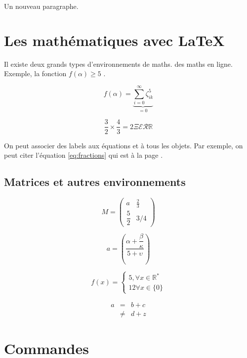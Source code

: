 \documentclass[a4paper, twoside, onecolumn, 10pt]{article}
\begin{document}
Un nouveau paragraphe. 

\section{Les mathématiques avec \LaTeX}

Il existe deux grands types d'environnements de maths. des maths en ligne. Exemple, la fonction $f(\alpha) \geq 5$ . 

$$
f(\alpha) = \underbrace{
			   \sum_{i = 0}^\infty \zeta_{ik}^5
			          }_{=0}		          
$$

\begin{equation}
\frac{3}{2} \times \frac{4}{3} = 2 \Xi \mathcal E \mathcal R \mathbb R
\label{eq:fractions}
\end{equation}

On peut associer des labels aux équations et à tous les objets. Par exemple, on peut citer l'équation \ref{eq:fractions} qui est à la page \pageref{eq:fractions}.

\subsection{Matrices et autres environnements}

\begin{equation}
M = 
\begin{pmatrix}
a & \frac{2}{3} \\
\dfrac{5}{2} & 3/4 
\end{pmatrix}
\end{equation}

$$
a = \left(
	\dfrac{\alpha + \dfrac{\beta}{\kappa}}{5+\upsilon}                                                               
	\right)
$$


$$
f(x) = \left\lbrace 
       \begin{split}
       5 , \forall x \in \mathbb R^* \\
       12 \forall x \in \lbrace 0 \rbrace  
       \end{split}
       \right.
$$

\begin{eqnarray}
a & = &  b + c \\
  & \neq & d + z
\end{eqnarray}

\section{Commandes}
\newcommand{\myvec}[1]{\vec{ \underline{\underline{#1}}} } %
\newcommand{\myvecc}[3]{ (#1, #2, #3) } %
\end{document}

